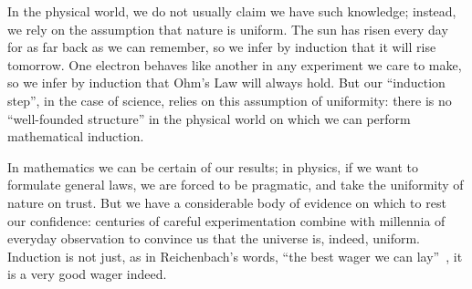 \documentclass[english]{scrartcl}
\begin{document}
In the physical world, we do not usually claim we have such knowledge; instead, we rely on the assumption that nature is uniform. The sun has risen every day for as far back as we can remember, so we infer by induction that it will rise tomorrow. One electron behaves like another in any experiment we care to make, so we infer by induction that Ohm’s Law will always hold. But our “induction step”, in the case of science, relies on this assumption of uniformity: there is no “well-founded structure” in the physical world on which we can perform mathematical induction.

In mathematics we can be certain of our results; in physics, if we want to formulate general laws, we are forced to be pragmatic, and take the uniformity of nature on trust. But we have a considerable body of evidence on which to rest our confidence: centuries of careful experimentation combine with millennia of everyday observation to convince us that the universe is, indeed, uniform. Induction is not just, as in Reichenbach’s words, “the best wager we can lay”~\cite{reichenbach1938eap}, it is a very good wager indeed.



\end{document}
